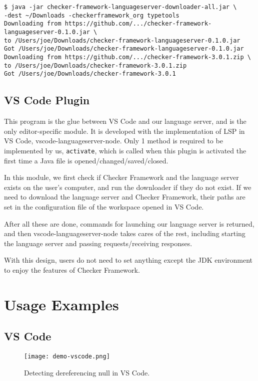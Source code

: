 \documentclass{article}
\begin{document}
\begin{lstlisting}
$ java -jar checker-framework-languageserver-downloader-all.jar \
-dest ~/Downloads -checkerframework_org typetools
Downloading from https://github.com/.../checker-framework-languageserver-0.1.0.jar \
to /Users/joe/Downloads/checker-framework-languageserver-0.1.0.jar
Got /Users/joe/Downloads/checker-framework-languageserver-0.1.0.jar
Downloading from https://github.com/.../checker-framework-3.0.1.zip \
to /Users/joe/Downloads/checker-framework-3.0.1.zip
Got /Users/joe/Downloads/checker-framework-3.0.1
\end{lstlisting}

\subsection{VS Code Plugin}

This program is the glue between VS Code and our language server, and is the
only editor-specific module. It is developed with the implementation of LSP in
VS Code, vscode-languageserver-node\cite{vslsp}. Only 1 method is required to be
implemented by us, \verb|activate|, which is called when this plugin is
activated the first time a Java file is opened/changed/saved/closed.

In this module, we first check if Checker Framework and the language server
exists on the user's computer, and run the downloader if they do not exist. If
we need to download the language server and Checker Framework, their paths are
set in the configuration file of the workspace opened in VS Code.

After all these are done, commands for launching our language server is
returned, and then vscode-languageserver-node takes cares of the rest, including
starting the language server and passing requests/receiving responses.

With this design, users do not need to set anything except the JDK environment
to enjoy the features of Checker Framework.


\section{Usage Examples}

\subsection{VS Code}

\begin{figure}
\centering
\texttt{[image: demo-vscode.png]}
\caption{Detecting dereferencing null in VS Code.}
\label{fig:demo-vscode}
\end{figure}
\end{document}
